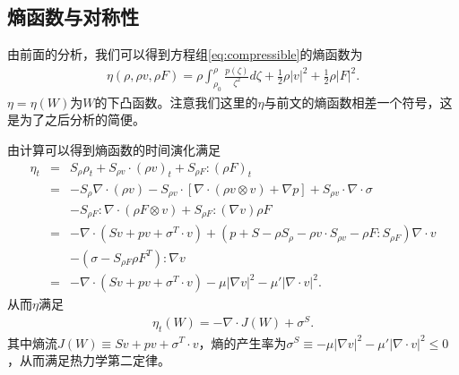 \subsection{熵函数与对称性}
由前面的分析，我们可以得到方程组\eqref{eq:compressible}的熵函数为
\begin{eqnarray}\label{22}
  \eta(\rho,\rho  v ,\rho F)  =  \rho \int_{\rho_0}^\rho \frac{p(\zeta)}{\zeta^2} d\zeta + \frac{1}{2} \rho | v |^2 + \frac{1}{2} \rho |F|^2.
\end{eqnarray}
$\eta = \eta(W)$为$W$的下凸函数。注意我们这里的$\eta$与前文的熵函数相差一个符号，这是为了之后分析的简便。

由计算可以得到熵函数的时间演化满足
\begin{eqnarray}\label{eq:entropy}
  \eta_t  &=& S_\rho \rho_t + S_{\rho  v } \cdot (\rho  v )_t  + S_{\rho F} : (\rho F)_t \nonumber \\
  &=& -S_{\rho} \nabla \cdot (\rho  v )  - S_{\rho  v  } \cdot [\nabla \cdot (\rho  v \otimes v ) + \nabla p] + S_{\rho  v } \cdot \nabla \cdot \sigma \nonumber \\
    &&- S_{\rho F} : \nabla \cdot (\rho F\otimes  v  ) + S_{\rho F}:(\nabla   v ) \rho F \nonumber \\
    &=& - \nabla \cdot (S  v +p  v  +\sigma^T \cdot v ) + (p+S - \rho S_\rho - \rho  v  \cdot S_{\rho  v } - \rho F : S_{\rho F}) \nabla \cdot  v  \nonumber \\
    &&- (\sigma - S_{\rho F} \rho F^T) : \nabla  v \nonumber \\
    &=& - \nabla \cdot (S  v +p  v  +\sigma^T \cdot v ) - \mu|\nabla  v |^2 - \mu'|\nabla\cdot v |^2.
\end{eqnarray}
从而$\eta$满足
\begin{eqnarray}\label{eq:entropyvol}
  \eta_t(W) = -\nabla\cdot J(W) + \sigma^S.
\end{eqnarray}
其中熵流$J(W)\equiv S  v +p  v  +\sigma^T \cdot v $，熵的产生率为$\sigma^S \equiv - \mu|\nabla  v |^2 - \mu'|\nabla\cdot v |^2 \le 0$，从而满足热力学第二定律。

